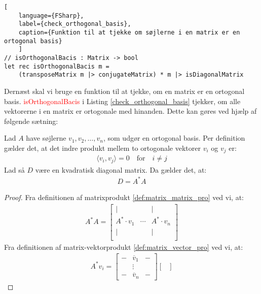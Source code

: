 \begin{lstlisting}[
    language={FSharp}, 
    label={check_orthogonal_basis}, 
    caption={Funktion til at tjekke om søjlerne i en matrix er en ortogonal basis}
    ]
// isOrthogonalBacis : Matrix -> bool
let rec isOrthogonalBacis m =
    (transposeMatrix m |> conjugateMatrix) * m |> isDiagonalMatrix
\end{lstlisting}



Dernæst skal vi bruge en funktion til at tjekke, om en matrix er en ortogonal basis. \textcolor{red}{isOrthogonalBacis} i Listing \ref{check_orthogonal_basis} tjekker, om alle vektorerne i en matrix er ortogonale med hinanden. Dette kan gøres ved hjælp af følgende sætning:

\vspace{0.5cm}
\begin{theorem}
    Lad \( A \) have søjlerne \( v_1, v_2, \ldots, v_n \), som udgør en ortogonal basis. Per definition gælder det, at det indre produkt mellem to ortogonale vektorer \( v_i \) og \( v_j \) er:
    \begin{gather}
        \langle v_i, v_j \rangle = 0 \quad \text{for} \quad i \neq j
    \end{gather}
    Lad så \( D \) være en kvadratisk diagonal matrix. Da gælder det, at:
    \begin{gather}
        D = A^* A
    \end{gather}
\begin{proof}
    Fra definitionen af matrixprodukt \ref{def:matrix_matrix_pro} ved vi, at:
    \begin{gather}
        A^*A = 
        \begin{bmatrix}
            | &  & | \\
            A^* \cdot v_1 & \cdots & A^* \cdot v_n \\
            | &  & | \\
        \end{bmatrix}
    \end{gather}
    Fra definitionen af matrix-vektorprodukt \ref{def:matrix_vector_pro} ved vi, at:
    \begin{gather}
        A^* v_i = 
        \begin{bmatrix}
            - & \overline{v}_{1} & - \\ 
            &\vdots& \\
            - & \overline{v}_{n} & - 
        \end{bmatrix}
        \begin{bmatrix}

\end{bmatrix}
\end{gather}
\end{proof}
\end{theorem}
